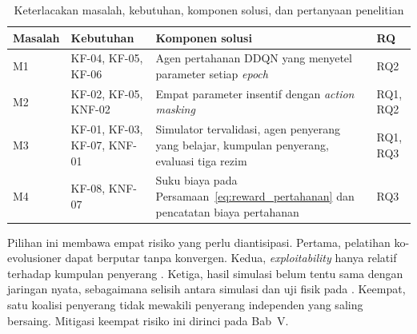 \begin{table}[htbp]
\centering
\caption{Keterlacakan masalah, kebutuhan, komponen solusi, dan pertanyaan penelitian}
\label{tab:keterlacakan}
\small
\begin{tabular}{|p{1.5cm}|p{3.1cm}|p{5.6cm}|p{2.0cm}|}
\hline
\textbf{Masalah} & \textbf{Kebutuhan} & \textbf{Komponen solusi} & \textbf{RQ} \\
\hline
M1 & KF-04, KF-05, KF-06 & Agen pertahanan DDQN yang menyetel parameter setiap \textit{epoch} & RQ2 \\
\hline
M2 & KF-02, KF-05, KNF-02 & Empat parameter insentif dengan \textit{action masking} & RQ1, RQ2 \\
\hline
M3 & KF-01, KF-03, KF-07, KNF-01 & Simulator tervalidasi, agen penyerang yang belajar, kumpulan penyerang, evaluasi tiga rezim & RQ1, RQ3 \\
\hline
M4 & KF-08, KNF-07 & Suku biaya pada Persamaan~\eqref{eq:reward_pertahanan} dan pencatatan biaya pertahanan & RQ3 \\
\hline
\end{tabular}
\end{table}

Pilihan ini membawa empat risiko yang perlu diantisipasi. Pertama, pelatihan ko-evolusioner dapat berputar tanpa konvergen. Kedua, \textit{exploitability} hanya relatif terhadap kumpulan penyerang \parencite{wushishi2026coadam}. Ketiga, hasil simulasi belum tentu sama dengan jaringan nyata, sebagaimana selisih antara simulasi dan uji fisik pada \textcite{wushishi2026coadam}. Keempat, satu koalisi penyerang tidak mewakili penyerang independen yang saling bersaing. Mitigasi keempat risiko ini dirinci pada Bab~V.